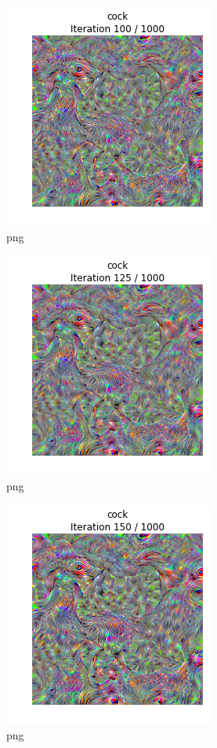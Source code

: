 \documentclass[]{book}
\theoremstyle{definition}
\theoremstyle{definition}
\theoremstyle{definition}
\theoremstyle{remark}
\begin{document}
\begin{figure}
\centering
\includegraphics{Network-Visualization-TensorFlow_files/Network-Visualization-TensorFlow_22_4.png}
\caption{png}
\end{figure}

\begin{figure}
\centering
\includegraphics{Network-Visualization-TensorFlow_files/Network-Visualization-TensorFlow_22_5.png}
\caption{png}
\end{figure}

\begin{figure}
\centering
\includegraphics{Network-Visualization-TensorFlow_files/Network-Visualization-TensorFlow_22_6.png}
\caption{png}
\end{figure}
\end{document}
